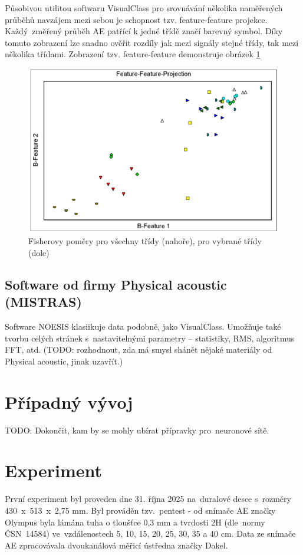 Působivou utilitou softwaru VisualClass pro srovnávání
několika naměřených průběhů navzájem mezi sebou je 
schopnost tzv. feature-feature projekce.
Každý~změřený průběh AE patřící k jedné třídě 
značí barevný symbol. Díky tomuto zobrazení lze 
snadno ověřit rozdíly jak mezi signály stejné třídy, 
tak mezi několika třídami. Zobrazení tzv. feature-feature demonstruje 
obrázek \ref{fig:vallen_feature_feature}
\begin{figure}[!ht]
    \centering
    \includegraphics[width=0.75\linewidth]{obrazky/visual_class_feature_feature.png}
    \caption{Fisherovy poměry pro všechny třídy (nahoře), pro vybrané třídy (dole) \cite{vallen_visual_class}}
    \label{fig:vallen_feature_feature}
\end{figure}
\subsection{Software od firmy Physical acoustic (MISTRAS)}
Software NOESIS klasiikuje data podobně, 
jako VisualClass. Umožňuje také tvorbu celých stránek 
s~nastavitelnými parametry – statistiky, 
RMS, algoritmus FFT, atd. (TODO: rozhodnout,
zda má smysl shánět nějaké materiály od Physical acoustic,
 jinak uzavřít.)
\section{Případný vývoj}
TODO: Dokončit, kam by se mohly ubírat přípravky pro~neuronové sítě.
\section{Experiment}
První experiment byl 
proveden dne 31. října 2025 na~duralové
desce s~rozměry 430~x~513~x~2,75 mm. Byl prováděn 
tzv.~pentest - od snímače AE značky 
Olympus byla lámána tuha
o tloušťce 0,3 mm a tvrdosti 2H (dle~normy ČSN~14584\cite{čsn14584})
ve~vzdálenostech 5, 10, 15, 20, 25, 30, 35 a 40 cm.
Data ze snímače AE zpracovávala dvoukanálová měřicí ústředna
značky Dakel.






